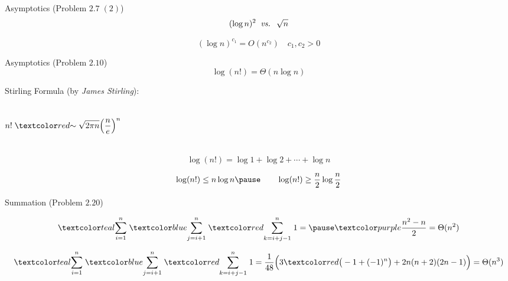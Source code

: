 \begin{frame}{}
  \begin{exampleblock}{Asymptotics (Problem $2.7\; (2)$)}
    \[
      (\log n)^{2} \;\;\text{\it vs. }\; \sqrt{n}
    \]
  \end{exampleblock}

  \pause
  \[
    (\log n)^{c_1} = O(n^{c_2}) \quad c_1, c_2 > 0
  \]
\end{frame}

\begin{frame}{}
  \begin{exampleblock}{Asymptotics (Problem $2.10$)}
    \[
      \log(n!) = \Theta(n \log n)
    \]
  \end{exampleblock}

  \pause
  \vspace{0.30cm}
  \begin{alertblock}{Stirling Formula (by {\it James Stirling}):}
    \begin{columns}
	\[
	  n! \;\red{\sim}\; \sqrt{2 \pi n} \Big(\frac{n}{e}\Big)^{n}
	\]
    \end{columns}
  \end{alertblock}

  \pause
  \vspace{0.30cm}
  \[
    \log (n!) = \log 1 + \log 2 + \cdots + \log n
  \]

  \pause
  \[
    \log (n!) \le n \log n \pause \qquad \log (n!) \ge \frac{n}{2} \log \frac{n}{2}
  \]
\end{frame}

\begin{frame}{}
  \begin{exampleblock}{Summation (Problem $2.20$)}
    \vspace{-0.30cm}
    
  \end{exampleblock}

  \pause
  \[
    \teal{\sum_{i=1}^{n}}\; \blue{\sum_{j=i+1}^{n}}\; \red{\sum_{k=i+j-1}^{n}}\; 1 = \pause \purple{\frac{n^2-n}{2}} = \Theta(n^2)
  \]

  \pause
  \vspace{-0.50cm}
  \[
    \teal{\sum_{i=1}^{n}}\; \blue{\sum_{j=i+1}^{n}}\; \red{\sum_{k=i+j-1}^{n}}\; 1 = \frac{1}{48} \Big(3 \red{\big(-1 + (-1)^n \big)} + 2n (n+2) (2n-1)\Big) = \Theta(n^3)
  \]
\end{frame}

